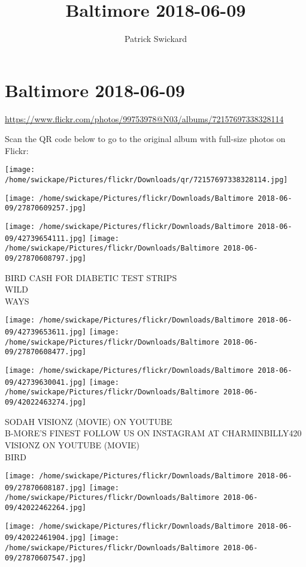 \documentclass[10pt,letterpaper]{article}
\title{Baltimore 2018-06-09}
\author{Patrick Swickard}
\date{}
\begin{document}
\section*{Baltimore 2018-06-09}

\url{https://www.flickr.com/photos/99753978@N03/albums/72157697338328114}

Scan the QR code below to go to the original album with full-size photos on Flickr:

\texttt{[image: /home/swickape/Pictures/flickr/Downloads/qr/72157697338328114.jpg]}
\pagebreak

\texttt{[image: /home/swickape/Pictures/flickr/Downloads/Baltimore 2018-06-09/27870609257.jpg]}

\vspace{0.25in}
\texttt{[image: /home/swickape/Pictures/flickr/Downloads/Baltimore 2018-06-09/42739654111.jpg]}
\texttt{[image: /home/swickape/Pictures/flickr/Downloads/Baltimore 2018-06-09/27870608797.jpg]}

BIRD CASH FOR DIABETIC TEST STRIPS\\
WILD\\
WAYS
\pagebreak

\texttt{[image: /home/swickape/Pictures/flickr/Downloads/Baltimore 2018-06-09/42739653611.jpg]}
\texttt{[image: /home/swickape/Pictures/flickr/Downloads/Baltimore 2018-06-09/27870608477.jpg]}

\texttt{[image: /home/swickape/Pictures/flickr/Downloads/Baltimore 2018-06-09/42739630041.jpg]}
\texttt{[image: /home/swickape/Pictures/flickr/Downloads/Baltimore 2018-06-09/42022463274.jpg]}

SODAH VISIONZ (MOVIE) ON YOUTUBE\\
B{-}MORE'S FINEST FOLLOW US ON INSTAGRAM AT CHARMINBILLY420\\
VISIONZ ON YOUTUBE (MOVIE)\\
BIRD
\pagebreak

\texttt{[image: /home/swickape/Pictures/flickr/Downloads/Baltimore 2018-06-09/27870608187.jpg]}
\texttt{[image: /home/swickape/Pictures/flickr/Downloads/Baltimore 2018-06-09/42022462264.jpg]}

\texttt{[image: /home/swickape/Pictures/flickr/Downloads/Baltimore 2018-06-09/42022461904.jpg]}
\texttt{[image: /home/swickape/Pictures/flickr/Downloads/Baltimore 2018-06-09/27870607547.jpg]}
\end{document}

